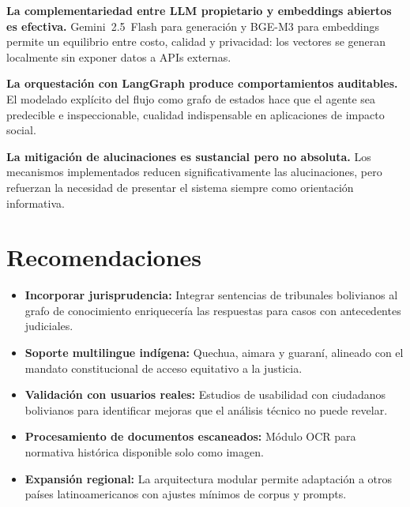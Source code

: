 \documentclass[12pt, letterpaper]{report}
\begin{document}
\textbf{La complementariedad entre LLM propietario y embeddings abiertos es efectiva.} Gemini~2.5~Flash para generaci\'{o}n y BGE-M3 para embeddings permite un equilibrio entre costo, calidad y privacidad: los vectores se generan localmente sin exponer datos a APIs externas.

\textbf{La orquestaci\'{o}n con LangGraph produce comportamientos auditables.} El modelado expl\'{i}cito del flujo como grafo de estados hace que el agente sea predecible e inspeccionable, cualidad indispensable en aplicaciones de impacto social.

\textbf{La mitigaci\'{o}n de alucinaciones es sustancial pero no absoluta.} Los mecanismos implementados reducen significativamente las alucinaciones, pero refuerzan la necesidad de presentar el sistema siempre como orientaci\'{o}n informativa.

\section{Recomendaciones}

\begin{itemize}
  \item \textbf{Incorporar jurisprudencia:} Integrar sentencias de tribunales bolivianos al grafo de conocimiento enriquecer\'{i}a las respuestas para casos con antecedentes judiciales.
  \item \textbf{Soporte multilingue ind\'{i}gena:} Quechua, aimara y guaran\'{i}, alineado con el mandato constitucional de acceso equitativo a la justicia.
  \item \textbf{Validaci\'{o}n con usuarios reales:} Estudios de usabilidad con ciudadanos bolivianos para identificar mejoras que el an\'{a}lisis t\'{e}cnico no puede revelar.
  \item \textbf{Procesamiento de documentos escaneados:} M\'{o}dulo OCR para normativa hist\'{o}rica disponible solo como imagen.
  \item \textbf{Expansi\'{o}n regional:} La arquitectura modular permite adaptaci\'{o}n a otros pa\'{i}ses latinoamericanos con ajustes m\'{i}nimos de corpus y prompts.
\end{itemize}


\printbibliography[heading=bibintoc, title={Referencias Bibliogr\'{a}ficas}]
\end{document}
